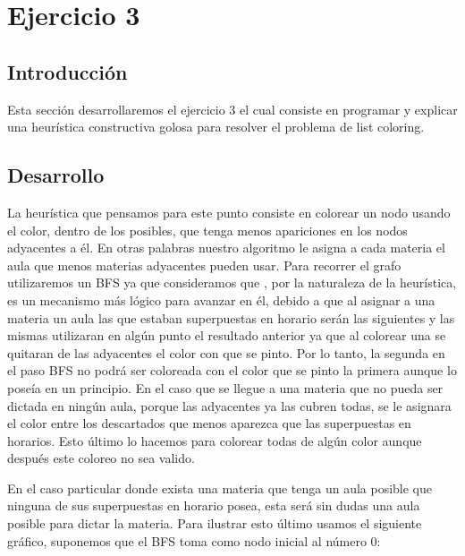 \section{Ejercicio 3}

\subsection{Introducción}

Esta sección desarrollaremos el ejercicio 3 el cual consiste en programar y explicar una heurística constructiva golosa para resolver el problema de list coloring.

\subsection{Desarrollo}

La heurística que pensamos para este punto consiste en colorear un nodo usando el color, dentro de los posibles, que tenga menos apariciones en los nodos adyacentes a él. En
otras palabras nuestro algoritmo le asigna a cada materia el aula que menos materias adyacentes pueden usar. Para recorrer el grafo utilizaremos un BFS ya que consideramos que
, por la naturaleza de la heurística, es un mecanismo más lógico para avanzar en él, debido a que al asignar a una materia un aula las que estaban superpuestas en horario 
serán las siguientes y las mismas utilizaran en algún punto el resultado anterior ya que al colorear una se quitaran de las adyacentes el color con que se pinto. Por lo tanto,
la segunda en el paso BFS no podrá ser coloreada con el color que se pinto la primera aunque lo poseía en un principio. En el caso que se llegue a una materia que no pueda ser
dictada en ningún aula, porque las adyacentes ya las cubren todas, se le asignara el color entre los descartados que menos aparezca que las superpuestas en horarios. Esto último
lo hacemos para colorear todas de algún color aunque después este coloreo no sea valido.

En el caso particular donde exista una materia que tenga un aula posible que ninguna de sus superpuestas en horario posea, esta será sin dudas una aula posible para dictar la materia. Para ilustrar esto último usamos el siguiente gráfico, 
suponemos que el BFS toma como nodo inicial al número 0:


